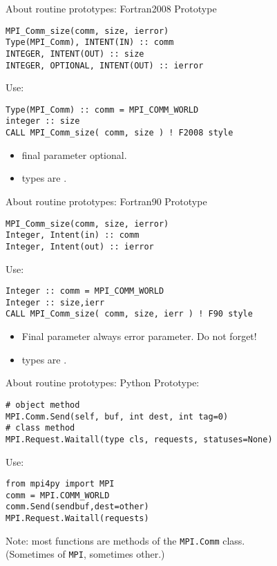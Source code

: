 \begin{mpithree}
\begin{numberedframe}{About routine prototypes: Fortran2008}
Prototype
\lstset{language=Fortran}
\begin{lstlisting}
MPI_Comm_size(comm, size, ierror)
Type(MPI_Comm), INTENT(IN) :: comm
INTEGER, INTENT(OUT) :: size
INTEGER, OPTIONAL, INTENT(OUT) :: ierror
\end{lstlisting}
Use:
\begin{lstlisting}
Type(MPI_Comm) :: comm = MPI_COMM_WORLD
integer :: size
CALL MPI_Comm_size( comm, size ) ! F2008 style
\end{lstlisting}
\begin{itemize}
\item final parameter optional.
\item {} types are .
\end{itemize}
\end{numberedframe}
\begin{numberedframe}{About routine prototypes: Fortran90}
Prototype
\lstset{language=Fortran}
\begin{lstlisting}
MPI_Comm_size(comm, size, ierror)
Integer, Intent(in) :: comm
Integer, Intent(out) :: ierror
\end{lstlisting}
Use:
\begin{lstlisting}
Integer :: comm = MPI_COMM_WORLD
Integer :: size,ierr
CALL MPI_Comm_size( comm, size, ierr ) ! F90 style
\end{lstlisting}
\begin{itemize}
\item Final parameter always error parameter. Do not forget!
\item {} types are .
\end{itemize}
\end{numberedframe}
\end{mpithree}

\begin{numberedframe}{About routine prototypes: Python}
Prototype:
\lstset{language=Python}
\begin{lstlisting}
# object method
MPI.Comm.Send(self, buf, int dest, int tag=0)
# class method
MPI.Request.Waitall(type cls, requests, statuses=None)
\end{lstlisting}
Use:
\begin{lstlisting}
from mpi4py import MPI
comm = MPI.COMM_WORLD
comm.Send(sendbuf,dest=other)
MPI.Request.Waitall(requests)
\end{lstlisting}
Note: most functions are methods of the \lstinline{MPI.Comm} class.\\
(Sometimes of \lstinline{MPI}, sometimes other.)
\end{numberedframe}


